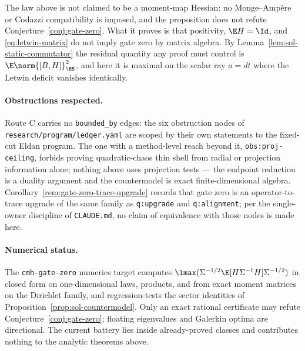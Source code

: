 \documentclass[../main.tex]{subfiles}
\begin{document}
\begin{corollary}[Scope]
\label{cor:sol-countermodel-scope}
The law above is not claimed to be a moment-map Hessian: no Monge--Amp\`ere or Codazzi
compatibility is imposed, and the proposition does not refute
Conjecture~\ref{conj:gate-zero}. What it proves is that positivity, $\E H=\Id$, and
\eqref{eq:letwin-matrix} do not imply gate zero by matrix algebra. By
Lemma~\ref{lem:sol-static-commutator} the residual quantity any proof must control is
$\E\norm{[B,H]}_{\HS}^2$, and here it is maximal on the scalar ray $a=dt$ where the Letwin
deficit vanishes identically.
\end{corollary}

\paragraph{Obstructions respected.}
Route C carries no \texttt{bounded\_by} edges: the six obstruction nodes of
\texttt{research/program/ledger.yaml} are scoped by their own statements to the fixed-cut
Eldan program.
The one with a method-level reach beyond it, \texttt{obs:proj-ceiling}, forbids proving
quadratic-chaos thin shell from radial or projection information alone; nothing above uses
projection tests --- the endpoint reduction is a duality argument and the countermodel is exact
finite-dimensional algebra. Corollary~\ref{rem:gate-zero-trace-upgrade} records that gate zero is
an operator-to-trace upgrade of the same family as \texttt{q:upgrade} and
\texttt{q:alignment}; per the single-owner discipline of \texttt{CLAUDE.md}, no claim of
equivalence with those nodes is made here.

\paragraph{Numerical status.}
The \texttt{cmh-gate-zero} numerics target computes
$\lmax(\Sigma^{-1/2}\E[H\Sigma^{-1}H]\Sigma^{-1/2})$ in closed form on one-dimensional laws,
products, and from exact moment matrices on the Dirichlet family, and regression-tests the sector
identities of Proposition~\ref{prop:sol-countermodel}. Only an exact rational certificate may
refute Conjecture~\ref{conj:gate-zero}; floating eigenvalues and Galerkin optima are directional.
The current battery lies inside already-proved classes and contributes nothing to the analytic
theorems above.
\end{document}
